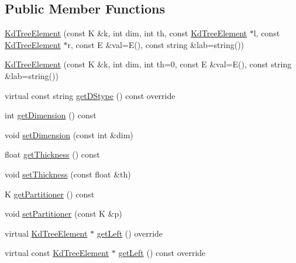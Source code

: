 \subsection*{Public Member Functions}
\begin{DoxyCompactItemize}
\item 
\hyperlink{classbridges_1_1datastructure_1_1_kd_tree_element_a5dd9f121e73a5c0643dfb52401472297}{Kd\+Tree\+Element} (const K \&k, int dim, int th, const \hyperlink{classbridges_1_1datastructure_1_1_kd_tree_element}{Kd\+Tree\+Element} $\ast$l, const \hyperlink{classbridges_1_1datastructure_1_1_kd_tree_element}{Kd\+Tree\+Element} $\ast$r, const E \&val=E(), const string \&lab=string())
\item 
\hyperlink{classbridges_1_1datastructure_1_1_kd_tree_element_a5c8f171b78e65a4e07e93282a0f713f6}{Kd\+Tree\+Element} (const K \&k, int dim, int th=0, const E \&val=E(), const string \&lab=string())
\item 
virtual const string \hyperlink{classbridges_1_1datastructure_1_1_kd_tree_element_a76f6d9bfadfdec09d0a8564aa0e33235}{get\+D\+Stype} () const override
\item 
int \hyperlink{classbridges_1_1datastructure_1_1_kd_tree_element_a0321f13830707107198df2d96ff0bc2d}{get\+Dimension} () const
\item 
void \hyperlink{classbridges_1_1datastructure_1_1_kd_tree_element_a9862bde7b85254224963e23dd9bcee29}{set\+Dimension} (const int \&dim)
\item 
float \hyperlink{classbridges_1_1datastructure_1_1_kd_tree_element_ae75460d9b4cfbcf013b0376a8f2948ec}{get\+Thickness} () const
\item 
void \hyperlink{classbridges_1_1datastructure_1_1_kd_tree_element_ae6c83b12eddf3bafc4b617812b6bbc8e}{set\+Thickness} (const float \&th)
\item 
K \hyperlink{classbridges_1_1datastructure_1_1_kd_tree_element_a6b284e9ba808f70e163977ee1e35ba86}{get\+Partitioner} () const
\item 
void \hyperlink{classbridges_1_1datastructure_1_1_kd_tree_element_a4b16d09eaad8da023bb48ead6f3dcfad}{set\+Partitioner} (const K \&p)
\item 
virtual \hyperlink{classbridges_1_1datastructure_1_1_kd_tree_element}{Kd\+Tree\+Element} $\ast$ \hyperlink{classbridges_1_1datastructure_1_1_kd_tree_element_a875bfa2dfd88a7740f7bcd28a117c12a}{get\+Left} () override
\item 
virtual const \hyperlink{classbridges_1_1datastructure_1_1_kd_tree_element}{Kd\+Tree\+Element} $\ast$ \hyperlink{classbridges_1_1datastructure_1_1_kd_tree_element_a653597918fbc6e31b84fcf8dbdf67122}{get\+Left} () const override

\end{DoxyCompactItemize}
